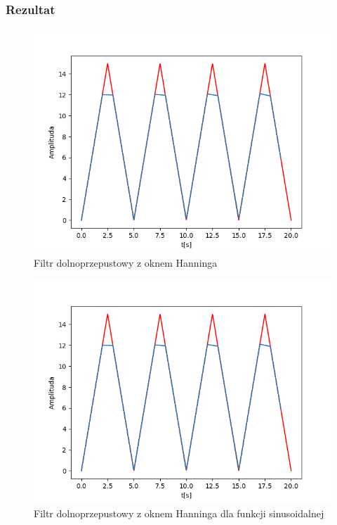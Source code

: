 \documentclass[12pt]{article}
\begin{document}
\subsubsection{Rezultat}
\begin{figure}[H]
\centering
\includegraphics[scale=0.6]{8trojkatInterp1rzedu20.png}
\caption{Filtr dolnoprzepustowy z oknem Hanninga}
\end{figure}

\begin{figure}[H]
\centering
\includegraphics[scale=0.6]{8trojkatInterp1rzedu20.png}
\caption{Filtr dolnoprzepustowy z oknem Hanninga dla funkcji sinusoidalnej}
\end{figure}
\end{document}
